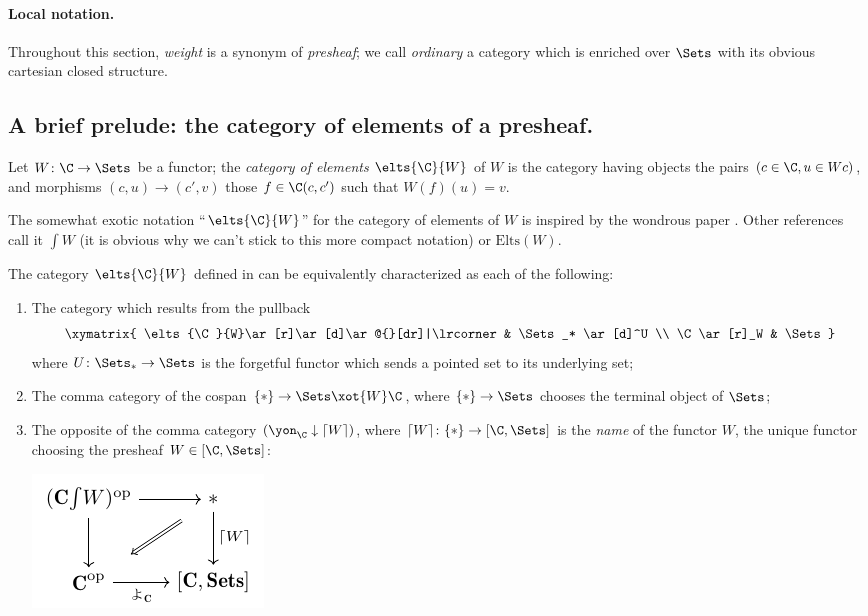 \paragraph{\bf Local notation.} Throughout this section, \emph{weight} is a synonym of \emph{presheaf}; we call \emph{ordinary} a category which is enriched over $\Sets$ with its obvious cartesian closed structure.
\subsection[The category of elements of a presheaf.]{A brief prelude: the category of elements of a presheaf.}
\begin{definition}\label{eltsf}
Let $W\colon \C\to \Sets$ be a functor; the \emph{category of elements} $\elts{\C}{W}$ of $W$ is the category having objects the pairs $(c\in\C, u\in Wc)$, and morphisms $(c,u)\to (c',v)$ those $f\in \C(c,c')$ such that $W(f)(u)=v$.
\end{definition}
\begin{notat}
The somewhat exotic notation ``$\elts{\C}{W}$'' for the category of elements of $W$ is inspired by the wondrous paper \cite{Graya}. Other references call it $\int W$ (it is obvious why we can't stick to this more compact notation) or $\text{Elts}(W)$.
\end{notat}
\begin{proposition}
The category $\elts{\C}{W}$ defined in  can be equivalently characterized as each of the following:
\begin{enumerate}[label=$\roman*$)]
\item The category which results from the pullback 
\[
\xymatrix{
  \elts{\C}{W}\ar[r]\ar[d]\ar@{}[dr]|\lrcorner & \Sets_* \ar[d]^U \\
  \C \ar[r]_W & \Sets
}
\]
where $U\colon \Sets_*\to\Sets$ is the forgetful functor which sends a pointed set to its underlying set;
\item The comma category \cite[]{} of the cospan $\{*\}\to \Sets \xot{W} \C$, where $\{*\}\to \Sets$ chooses the terminal object of $\Sets$;
\item The opposite of the comma category $(\yon_{\C}\downarrow \lceil W\rceil)$, where $\lceil W\rceil\colon \{*\}\to [\C, \Sets]$ is the \emph{name} of the functor $W$, \ie the unique functor choosing the presheaf $W\in [\C, \Sets]$:
\begin{center}
\includegraphics[scale=1]{figures/fig5}
\end{center}
\end{enumerate}
\end{proposition}
